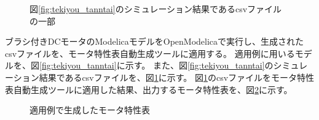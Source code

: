 \begin{figure}[t]
	\centering
	\caption{図\ref{fig:tekiyou_tanntai}のシミュレーション結果であるcsvファイルの一部}
	\label{fig:tekiyou_csv}
\end{figure}

ブラシ付きDCモータのModelicaモデルをOpenModelicaで実行し、生成されたcsvファイルを、モータ特性表自動生成ツールに適用する。
適用例に用いるモデルを、図\ref{fig:tekiyou_tanntai}に示す。
また、図\ref{fig:tekiyou_tanntai}のシミュレーション結果であるcsvファイルを、図\ref{fig:tekiyou_csv}に示す。
図\ref{fig:tekiyou_csv}のcsvファイルをモータ特性表自動生成ツールに適用した結果、出力するモータ特性表を、図\ref{fig:tekiyou_mortoku}に示す。


\begin{figure}[t]
	\centering
	\caption{適用例で生成したモータ特性表}
	\label{fig:tekiyou_mortoku}
\end{figure}

